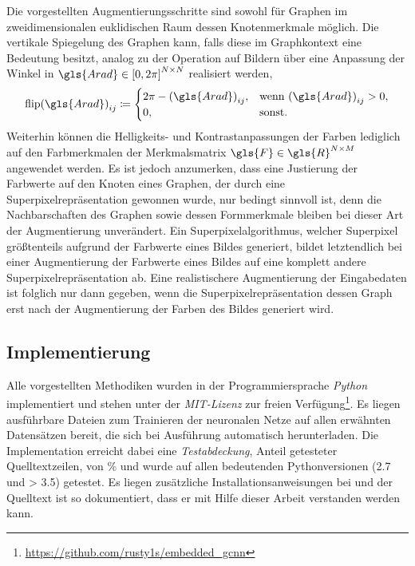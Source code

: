 Die vorgestellten Augmentierungsschritte sind sowohl für Graphen im zweidimensionalen euklidischen Raum \bzw{} dessen Knotenmerkmale möglich.
Die vertikale Spiegelung des Graphen kann, falls diese im Graphkontext eine Bedeutung besitzt, analog zu der Operation auf Bildern über eine Anpassung der Winkel in $\gls{Arad} \in {\left[0, 2\pi\right]}^{N \times N}$ realisiert werden, \dhe{}
\begin{equation*}
  {\mathrm{flip}\left(\gls{Arad}\right)}_{ij} \coloneqq \begin{cases}
    2\pi - {\left(\gls{Arad}\right)}_{ij}, & \text{wenn } {\left(\gls{Arad}\right)}_{ij} > 0,\\
    0, & \text{sonst.}
  \end{cases}
\end{equation*}
Weiterhin können die Helligkeits- und Kontrastanpassungen der Farben lediglich auf den Farbmerkmalen der Merkmalsmatrix $\gls{F} \in \gls{R}^{N \times M}$ angewendet werden.
Es ist jedoch anzumerken, dass eine Justierung der Farbwerte auf den Knoten eines Graphen, der durch eine Superpixelrepräsentation gewonnen wurde, nur bedingt sinnvoll ist, denn die Nachbarschaften des Graphen sowie dessen Formmerkmale bleiben bei dieser Art der Augmentierung unverändert.
Ein Superpixelalgorithmus, welcher Superpixel größtenteils aufgrund der Farbwerte eines Bildes generiert, bildet letztendlich bei einer Augmentierung der Farbwerte eines Bildes auf eine komplett andere Superpixelrepräsentation ab.
Eine realistischere Augmentierung der Eingabedaten ist folglich nur dann gegeben, wenn die Superpixelrepräsentation \bzw{} dessen Graph erst nach der Augmentierung der Farben des Bildes generiert wird.

\subsection{Implementierung}
\label{implementierung}

Alle vorgestellten Methodiken wurden in der Programmiersprache \emph{Python} implementiert und stehen unter der \emph{MIT-Lizenz} zur freien Verfügung\footnote{\url{https://github.com/rusty1s/embedded\_gcnn}}.
Es liegen ausführbare Dateien zum Trainieren der neuronalen Netze auf allen erwähnten Datensätzen bereit, die sich bei Ausführung automatisch herunterladen.
Die Implementation erreicht dabei eine \emph{Testabdeckung}, \dhe{} Anteil getesteter Quelltextzeilen, von \codecov{}\% und wurde auf allen bedeutenden Pythonversionen (2.7 und > 3.5) getestet.
Es liegen zusätzliche Installationsanweisungen bei und der Quelltext ist so dokumentiert, dass er mit Hilfe dieser Arbeit verstanden werden kann.

